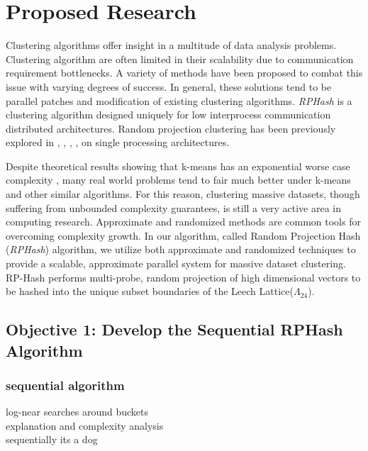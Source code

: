 \documentclass[a4paper,10pt]{article}
\begin{document}
\section{Proposed Research}
Clustering algorithms offer
insight in a multitude of data analysis problems.  Clustering algorithm are
often limited in
their scalability due to communication requirement bottlenecks. 
 A variety of methods have been  proposed to combat this issue with varying
degrees of success. In general, these solutions tend to be parallel patches and
modification of existing clustering algorithms. \emph{RPHash} is a clustering 
algorithm designed uniquely for low interprocess communication 
distributed architectures. 
Random projection clustering 
has been previously explored in \cite{Urruty2007}, \cite{florescu09}, 
\cite{fernrandom}, \cite{avogadri09}, on single processing architectures. 

Despite theoretical results showing that k-means has an
exponential worse  case complexity \cite{Vattani}, many real world problems tend
to fair much  better under k-means and other similar algorithms.  For this
reason, clustering  massive datasets, though suffering from unbounded complexity
guarantees, is still a very active area in computing research.   Approximate and
randomized methods are common  tools for overcoming complexity growth.  In our
algorithm, called Random Projection Hash  (\emph{RPHash}) algorithm, we
utilize both approximate and randomized techniques to provide a scalable,
approximate parallel system for massive dataset clustering. 
RP-Hash performs multi-probe, random
projection of high dimensional vectors to be hashed into the unique subset
boundaries of the Leech Lattice($\Lambda_{24}$). 

\subsection{Objective 1: Develop the  Sequential RPHash Algorithm}
\subsubsection{sequential algorithm}

log-near searches around buckets\cite{panigrahy}\\
explanation and complexity analysis\\

sequentially its a dog\\
\end{document}
